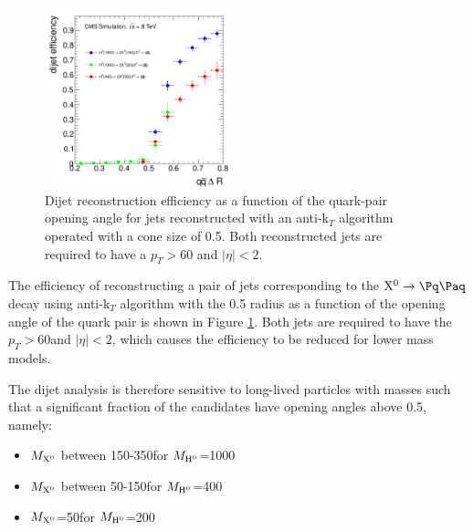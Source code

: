 \begin{figure}[htbp]
\centering
\includegraphics[width=0.49\textwidth]{plots/signal/effDijet.pdf}
\caption{Dijet reconstruction efficiency as a function of the quark-pair opening angle for jets reconstructed with an
anti-k$_T$ algorithm operated with a cone size of 0.5. Both reconstructed jets are required to have a $p_T>60$\GeV
and $|\eta|<2$.  \label{fig:effdR}}
\end{figure}

The efficiency of reconstructing a pair of jets
 corresponding to the $\X \to \qq$ decay using anti-k$_T$ algorithm with the 0.5 radius as a function of the
opening angle of the quark pair is shown in Figure \ref{fig:effdR}. Both jets are required 
to have the $p_T>60$\GeV and $|\eta|<2$, which causes the 
efficiency to be reduced for lower \Higgs  mass models.
 

The dijet analysis is therefore sensitive to long-lived \X particles with masses
such that a significant fraction of the candidates have opening angles above 0.5, namely:
\begin{itemize}
\item $M_{\mathrm{X^{0}}}$ between 150-350\GeV for $M_{\mathrm{H}^{0}}$=1000\GeV
\item $M_{\mathrm{X^{0}}}$ between 50-150\GeV for $M_{\mathrm{H}^{0}}$=400\GeV
\item $M_{\mathrm{X^{0}}}$=50\GeV for $M_{\mathrm{H}^{0}}$=200\GeV
\end{itemize}


